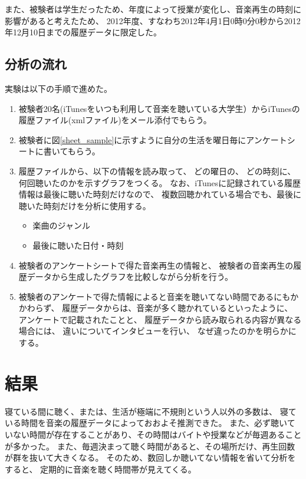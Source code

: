 \documentclass[11pt, onecolumn]{jsarticle}
\begin{document}
また、被験者は学生だったため、年度によって授業が変化し、音楽再生の時刻に影響があると考えたため、
2012年度、すなわち2012年4月1日0時0分0秒から2012年12月10日までの履歴データに限定した。
\subsection{分析の流れ}
実験は以下の手順で進めた。

\begin{enumerate}
\item
被験者20名(iTunesをいつも利用して音楽を聴いている大学生）からiTunesの履歴ファイル(xmlファイル)をメール添付でもらう。
\item
被験者に図\ref{sheet_sample}に示すように自分の生活を曜日毎にアンケートシートに書いてもらう。
\item
履歴ファイルから、以下の情報を読み取って、
どの曜日の、
どの時刻に、
何回聴いたのかを示すグラフをつくる。
なお、iTunesに記録されている履歴情報は最後に聴いた時刻だけなので、
複数回聴かれている場合でも、最後に聴いた時刻だけを分析に使用する。
\begin{itemize}
\item
楽曲のジャンル
\item
最後に聴いた日付・時刻
\end{itemize}


\item
被験者のアンケートシートで得た音楽再生の情報と、
被験者の音楽再生の履歴データから生成したグラフを比較しながら分析を行う。
\item
被験者のアンケートで得た情報によると音楽を聴いてない時間であるにもかかわらず、
履歴データからは、音楽が多く聴かれているといったように、
アンケートで記載されたことと、
履歴データから読み取られる内容が異なる場合には、
違いについてインタビューを行い、
なぜ違ったのかを明らかにする。
\end{enumerate}

\section{結果}
寝ている間に聴く、または、生活が極端に不規則という人以外の多数は、
寝ている時間を音楽の履歴データによっておおよそ推測できた。
また、必ず聴いていない時間が存在することがあり、その時間はバイトや授業などが毎週あることが多かった。
また、毎週決まって聴く時間があると、その場所だけ、再生回数が群を抜いて大きくなる。
そのため、数回しか聴いてない情報を省いて分析をすると、
定期的に音楽を聴く時間帯が見えてくる。
\end{document}
